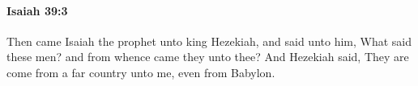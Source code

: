 
		\paragraph{Isaiah 39:3} %
			\label{ISAIAH-39-3}

			Then came Isaiah the prophet unto king Hezekiah, and said unto him, What said these men? and from whence came they unto thee? And Hezekiah said, They are come from a far country unto me, even from Babylon.


